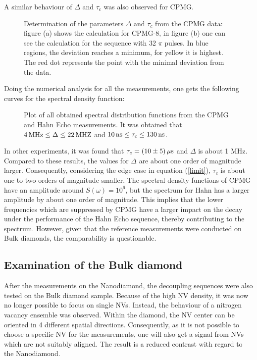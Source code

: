 \documentclass[12pt,a4paper]{article}
\begin{document}
A similar behaviour of $\Delta$ and $\tau_c$ was also observed for CPMG.
\begin{figure}[H]\label{C} 
    \caption{Determination of the parameters $\Delta$ and $\tau_c$ from the CPMG data: figure (a) shows the calculation for CPMG-8, in figure (b) one can see the calculation for the sequence with 32 $\pi$ pulses. In blue regions, the deviation reaches a minimum, for yellow it is highest. The red dot represents the point with the minimal deviation from the data.}
\end{figure}
Doing the numerical analysis for all the measurements, one gets the following curves for the spectral density function:
\begin{figure}[H]\label{nd} 
    \caption{Plot of all obtained spectral distribution functions from the CPMG and Hahn Echo measurements. It was obtained that $\unit[4]{MHz}\leq\Delta\leq\unit[22]{MHZ}$ and $\unit[10]{ns}\leq\tau_c\leq \unit[130]{ns}$.}
\end{figure}
In other experiments, it was found that $\tau_c=\unit[(10\pm5)]{\mu s}$ and $\Delta$ is about 1 MHz\cite{ssbd}. Compared to these results, the values for $\Delta$ are about one order of magnitude larger. Consequently, considering the edge case in equation (\ref{limit}), $\tau_c$ is about one to two orders of magnitude smaller. The spectral density functions of CPMG have an amplitude around $S(\omega)=10^6$, but the spectrum for Hahn has a larger amplitude by about one order of magnitude. This implies that the lower frequencies which are suppressed by CPMG have a larger impact on the decay under the performance of the Hahn Echo sequence, thereby contributing to the spectrum. However, given that the reference measurements were conducted on Bulk diamonds, the comparability is questionable.
 
\newpage
\subsection{Examination of the Bulk diamond}
After the measurements on the Nanodiamond, the decoupling sequences were also tested on the Bulk diamond sample. Because of the high NV density, it was now no longer possible to focus on single NVs. Instead, the behaviour of a nitrogen vacancy ensemble was observed. Within the diamond, the NV center can be oriented in 4 different spatial directions. Consequently, as it is not possible to choose a specific NV for the measurements, one will also get a signal from NVs which are not suitably aligned. The result is a reduced contrast with regard to the Nanodiamond.\\
\end{document}
